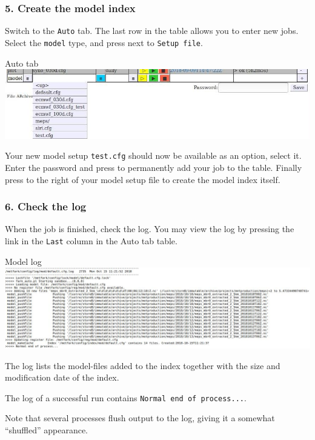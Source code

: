 \documentclass[letterpaper,10pt,twoside,twocolumn,openany]{book}
\begin{document}
{\subsubsection{5. Create the model index}
Switch to the \lstinline!Auto! tab.
The last row in the table allows you to enter new jobs.
Select the \lstinline!model! type, and press  next to \lstinline!Setup file!.
\begin{paperbox}{Auto tab}
  \includegraphics[width=\columnwidth]{how_auto.jpg}
\end{paperbox}
Your new model setup \lstinline!test.cfg! should now be available as an option, select it.
Enter the password and press 
to permanently add your job to the table.
Finally press  to the right of your model setup file to create the model index itself.

\subsubsection{6. Check the log}
When the job is finished, check the log. You may view the log by pressing the link in the \lstinline!Last! column in the Auto tab table.
\begin{paperbox}{Model log}
  \includegraphics[width=\columnwidth]{modlog.jpg}
\end{paperbox}
The log lists the model-files added to the index together with the size and modification date of the index.
\begin{quotebox}
   The log of a successful run contains \lstinline!Normal end of process...!.
\end{quotebox}
Note that several processes flush output to the log, giving it a somewhat ``shuffled'' appearance.

}
\end{document}
